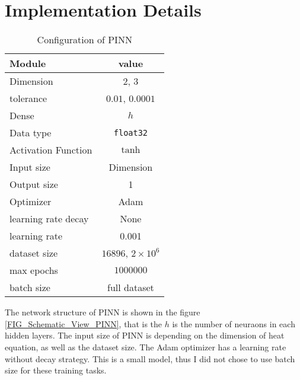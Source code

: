 \documentclass[manuscript, screen, review, language=english, natbib=false]{acmart}
\begin{document}









% 
% 

\printbibliography

\appendix
\section{Implementation Details}\label{APP:IMPLEMENTATION}
\begin{table}[htbp]
  \caption{Configuration of PINN}
  \label{TAB:BConfiguration_of_PINN}
  \begin{minipage}{\columnwidth}
    \begin{center}
        \begin{tabular}{lc}
            \toprule
            \bfseries Module   &  \bfseries value \\
            \midrule
            Dimension & $2$, $3$ \\
            tolerance & $0.01$, $0.0001$ \\
            Dense & $h$ \\
            Data type & \texttt{float32} \\
            Activation Function & $\tanh$ \\
            Input size & Dimension \\
            Output size & 1 \\
            Optimizer & Adam \\
            learning rate decay & None \\
            learning rate & 0.001 \\
            dataset size & $16896$, $2 \times 10^6$ \\
            max epochs  & $1000 000$ \\
            batch size & full dataset \\
            \bottomrule
        \bottomrule
      \end{tabular}
    \end{center}
  \end{minipage}
\end{table}
The network structure of PINN is shown in the figure \ref{FIG_Schematic_View_PINN}, that is the $h$ is the 
number of neuraons in each hidden layers.
The input size of PINN is depending on the dimension of 
heat equation, as well as the dataset size.
The Adam optimizer has a learning rate without decay 
strategy. 
This is a small model, thus I did not chose to use batch size for 
these training tasks.
\end{document}
